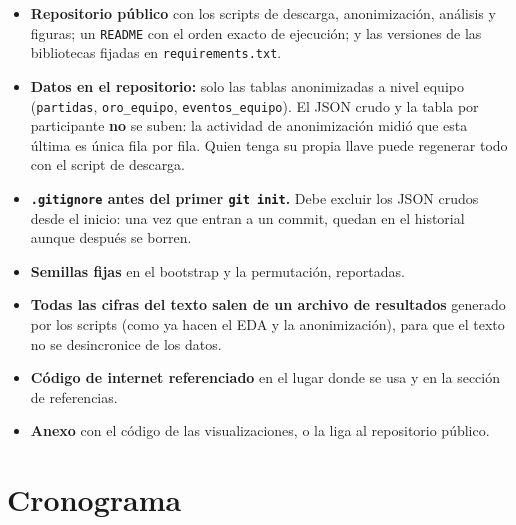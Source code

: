 \documentclass[11pt,letterpaper]{article}
\begin{document}
\begin{itemize}[leftmargin=1.4em,itemsep=.3em]
  \item \textbf{Repositorio público} con los scripts de descarga, anonimización,
        análisis y figuras; un \texttt{README} con el orden exacto de ejecución; y
        las versiones de las bibliotecas fijadas en \texttt{requirements.txt}.
  \item \textbf{Datos en el repositorio:} solo las tablas anonimizadas a nivel equipo
        (\texttt{partidas}, \texttt{oro\_equipo}, \texttt{eventos\_equipo}). El JSON
        crudo y la tabla por participante \textbf{no} se suben: la actividad de
        anonimización midió que esta última es única fila por fila. Quien tenga su
        propia llave puede regenerar todo con el script de descarga.
  \item \textbf{\texttt{.gitignore} antes del primer \texttt{git init}.} Debe excluir
        los JSON crudos desde el inicio: una vez que entran a un commit, quedan en el
        historial aunque después se borren.
  \item \textbf{Semillas fijas} en el bootstrap y la permutación, reportadas.
  \item \textbf{Todas las cifras del texto salen de un archivo de resultados} generado
        por los scripts (como ya hacen el EDA y la anonimización), para que el texto
        no se desincronice de los datos.
  \item \textbf{Código de internet referenciado} en el lugar donde se usa y en la
        sección de referencias.
  \item \textbf{Anexo} con el código de las visualizaciones, o la liga al
        repositorio público.
\end{itemize}

\section{Cronograma}
\end{document}
